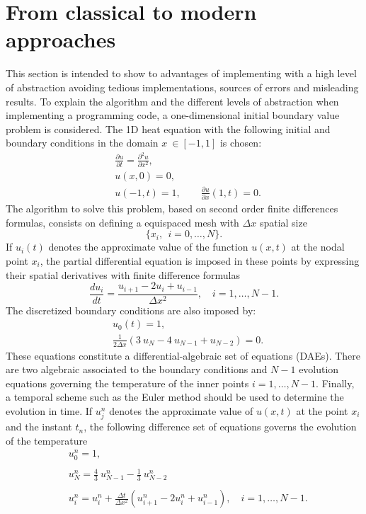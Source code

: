  \section{From classical to modern approaches}
 This section is intended to show to advantages of implementing with a high level of abstraction avoiding tedious implementations, sources
 of errors  and misleading results. 
 To explain the algorithm and the different levels of abstraction when implementing a programming code, a one-dimensional initial boundary value problem is considered. The 1D heat equation with the following initial and boundary conditions in the domain \ensuremath{x \ \in [-1,1]} is chosen:
            \begin{align*}
             &  \frac{\partial u}{\partial t} = \frac{\partial ^2 u}{\partial x^2}, \\
             & u(x, 0) = 0, \\
             & u(-1,t) = 1, \qquad \frac{ \partial u}{\partial x}(1, t)= 0.
            \end{align*}
The algorithm to solve this problem, based on second order finite differences formulas, consists on defining a equispaced mesh with $ \Delta x $ spatial size 
            $$
             \{ x_i, \ \ i=0, \ldots, N \}. 
           $$ 
If $ u_i(t) $ denotes the approximate value of the function $u(x,t) $ at the nodal point $ x_i $, the partial differential equation  is imposed in these points by expressing their spatial derivatives with finite difference formulas
            $$
                \frac{d u_i}{d t} = \frac{ u_{i+1} - 2 u_i + u_{i-1} }{ \Delta x^2 }, \quad i=1, \ldots,  N-1.
            $$
The discretized boundary conditions are also imposed by:  
            \begin{align*}
                     & u_0(t) = 1, \\
                     & \frac{1}{ 2 \Delta x} ( 3 \ u_N - 4 \ u_{N-1} + u_{N-2} )  = 0. 
            \end{align*}
These  equations constitute a differential-algebraic set of equations (DAEs). There are two algebraic associated to the boundary conditions and $ N-1 $ evolution equations governing the temperature of the inner points $ i=1, \ldots, N-1.$
Finally, a temporal scheme such as the Euler method should be used to determine the evolution in time. If $ u^n_j $ denotes the approximate
value of $ u(x,t) $ at the point $ x_i $ and the instant $ t_n $, the following difference set of equations governs the evolution of the temperature 
 \begin{align*}
                   &    u^n_0 = 1, \\ \\
                   &    u^n _N  = \frac{4}{3} \ u^n_{N-1} - \frac{1}{3} \ u^n_{N-2} \\ \\
                   & u^n_i = u^n_i + \frac{\Delta t} { \Delta x^2} \left( u^n_{i+1} - 2 u^n _i + u^n_{i-1} \right), \quad i=1, \ldots, N-1. 
 \end{align*}




